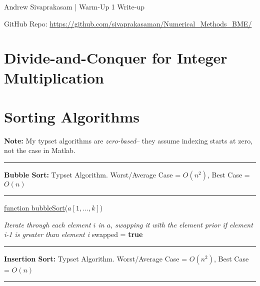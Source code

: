 \documentclass[9pt]{extarticle}
\begin{document}
{\huge Andrew Sivaprakasam | Warm-Up 1 Write-up}

GitHub Repo: \url{https://github.com/sivaprakasaman/Numerical_Methods_BME/} 

\section{Divide-and-Conquer for Integer Multiplication}

\newpage
\section{Sorting Algorithms}

\large\textbf{Note: } My typset algorithms are \textit{zero-based}-- they assume indexing starts at zero, not the case in Matlab.
\vspace{6pt}
\hrule
\vspace{6pt}
\large\textbf{Bubble Sort:} Typset Algorithm. Worst/Average Case = $O(n^2)$, Best Case = $O(n)$ 
\vspace{6pt}
\hrule

\begin{algorithm}[H]

\underline{function bubbleSort}($a[1,...,k]$)

\vspace{6pt}
\BlankLine
\emph{Iterate through each element $i$ in $a$, swapping it with the element prior if element i-1 is greater than element i}
\BlankLine
swapped = \textbf{true}\;
\BlankLine
{}
\vspace{6pt}
\end{algorithm}

\hrule
\vspace{6pt}
\large\textbf{Insertion Sort:} Typset Algorithm. Worst/Average Case = $O(n^2)$, Best Case = $O(n)$ 
\vspace{6pt}
\hrule
\end{document}
